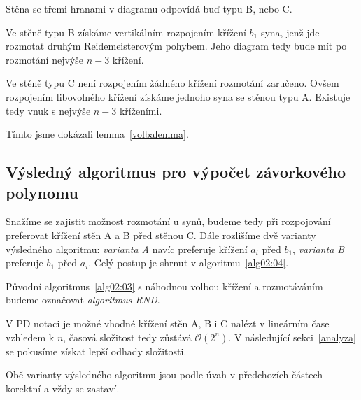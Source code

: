 Stěna se třemi hranami v diagramu odpovídá buď typu B, nebo C.

Ve stěně typu B získáme vertikálním rozpojením křížení $b_1$ syna, jenž jde rozmotat druhým Reidemeisterovým pohybem. Jeho diagram tedy bude mít po rozmotání nejvýše $n-3$ křížení.

Ve stěně typu C není rozpojením žádného křížení rozmotání zaručeno. Ovšem rozpojením libovolného křížení získáme jednoho syna se stěnou typu A. Existuje tedy vnuk s nejvýše $n-3$ kříženími.

Tímto jsme dokázali lemma~\ref{volbalemma}.

\subsection{Výsledný algoritmus pro výpočet závorkového polynomu} \label{varianty}
Snažíme se zajistit možnost rozmotání u synů, budeme tedy při rozpojování preferovat křížení stěn A a B před stěnou C. Dále rozlišíme dvě varianty výsledného algoritmu: \emph{varianta A} navíc preferuje křížení $a_i$ před $b_1$,  \emph{varianta B} preferuje $b_1$ před $a_i$. Celý postup je shrnut v algoritmu~\ref{alg02:04}.

Původní algoritmus~\ref{alg02:03} s náhodnou volbou křížení a rozmotáváním budeme označovat \emph{algoritmus RND}.

V PD notaci je možné vhodné křížení stěn A, B i C nalézt v lineárním čase vzhledem k $n$, časová složitost tedy zůstává $\mathcal{O}(2^n)$. V následující sekci~\ref{analyza} se pokusíme získat lepší odhady složitosti.

Obě varianty výsledného algoritmu jsou podle úvah v předchozích částech korektní a vždy se zastaví.

